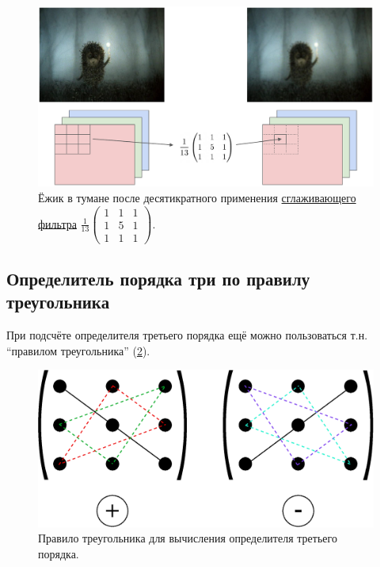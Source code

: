 \documentclass[a4paper,12pt]{article}
\begin{document}
  \begin{figure}[h]
    \centering
    
    \includegraphics[width=0.8\columnwidth]{EzhStripped.png}
    
    \caption{Ёжик в тумане после десятикратного применения \href{https://github.com/python-pillow/Pillow/blob/e4b39d9cc74f26dad1f5cad0851645cc2cd5356d/src/PIL/ImageFilter.py\#L305}{сглаживающего фильтра} $\frac{1}{13} \left(\begin{smallmatrix} 1 & 1 & 1 \\ 1 & 5 & 1 \\ 1 & 1 & 1 \end{smallmatrix}\right)$.}
    \label{fig:ezh-in-conv}
  \end{figure}
  
  
  \subsection{Определитель порядка три по правилу треугольника}
  
  При подсчёте определителя третьего порядка ещё можно пользоваться т.н. ``правилом треугольника'' (\ref{fig:triangle-rule}).
  
  \begin{figure}[h]
    \centering
    
    \includegraphics[width=0.6\columnwidth]{triangle-rule}
    
    \caption{Правило треугольника для вычисления определителя третьего порядка.}
    \label{fig:triangle-rule}
  \end{figure}
  
\end{document}
